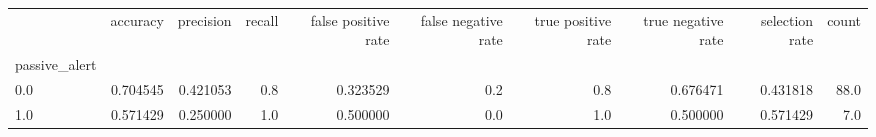 \begin{tabular}{lrrrrrrrrr}
\toprule
{} &  accuracy &  precision &  recall &  false positive rate &  false negative rate &  true positive rate &  true negative rate &  selection rate &  count \\
passive\_alert &           &            &         &                      &                      &                     &                     &                 &        \\
\midrule
0.0           &  0.704545 &   0.421053 &     0.8 &             0.323529 &                  0.2 &                 0.8 &            0.676471 &        0.431818 &   88.0 \\
1.0           &  0.571429 &   0.250000 &     1.0 &             0.500000 &                  0.0 &                 1.0 &            0.500000 &        0.571429 &    7.0 \\
\bottomrule
\end{tabular}
